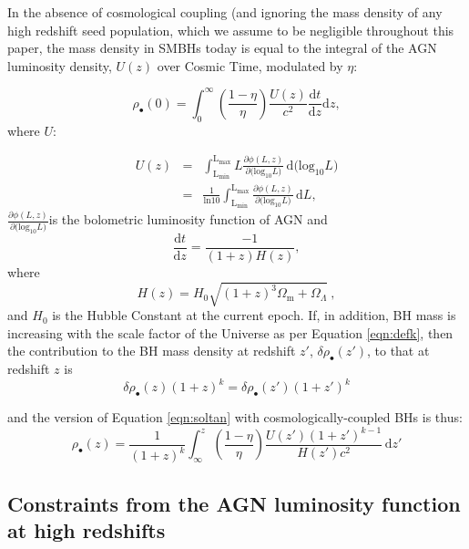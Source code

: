 \documentclass[twocolumn]{aastex631}
\begin{document}
In the absence of cosmological coupling (and ignoring the mass density of any high redshift seed population, which we assume to be negligible throughout this paper, the mass density in SMBHs today is equal to the integral of the AGN luminosity density, $U(z)$ over Cosmic Time, modulated by $\eta$: 

\begin{equation}\label{eqn:soltan}
    \rho_{\bullet}(0)= \int_{0}^{\infty} \left(\frac{1-\eta}{\eta} \right) \frac{U(z)}{c^{2}} \frac{\mathrm{d} t}{\mathrm{d} z} \mathrm{d}z,
\end{equation}
where $U$:

\begin{eqnarray}
U(z)&=&\int_{\mathrm{L_{min}}}^{\mathrm{L_{max}}} L \frac{\partial \phi(L,z)}{\partial\mathrm{(log_{10}} L) }\,\mathrm{d(log_{10}} L) \\
&=&\frac{1}{\mathrm{ln} 10}  \int_{\mathrm{L_{min}}}^{\mathrm{L_{max}}} \frac{\partial \phi(L,z)}{\partial\mathrm{(log_{10}} L) }\, \mathrm{d}L,
\end{eqnarray}
$\frac{\partial \phi(L,z)}{\partial\mathrm{(log_{10}} L)}$is the bolometric luminosity function of AGN and 
\begin{equation}
    \frac{\mathrm{d} t}{\mathrm{d} z} = \frac{-1}{(1+z) H(z)},
\end{equation}  
where
\begin{equation}
    H(z) =  H_0 \sqrt{(1+z)^3 \Omega_{\mathrm m} + \Omega_{\Lambda}} \ ,
\end{equation}
and $H_0$ is the Hubble Constant at the current epoch.
%
If, in addition, BH mass is increasing with the scale factor of the Universe as per Equation \ref{eqn:defk}, then the contribution to the BH mass density at redshift $z'$, $\delta \rho_{\bullet}(z')$, to that at redshift $z$ is 
\begin{equation}
    \delta \rho_{\bullet}(z) (1+z)^{k}=\delta \rho_{\bullet}(z') (1+z')^k
\end{equation}

and the version of Equation \ref{eqn:soltan} with cosmologically-coupled BHs is thus:
\begin{equation}\label{eqn:generalSoltan}
    \rho_{\bullet}(z)=  \frac{1}{(1+z)^k}\int_{\infty}^{z} \left( \frac{1-\eta}{\eta} \right) \frac{U(z')(1+z
    ')^{k-1}}{H(z')c^2} \,\mathrm{d} z'
\end{equation}



\subsection{Constraints from the AGN luminosity function at high redshifts}\label{highzLF}
\end{document}
